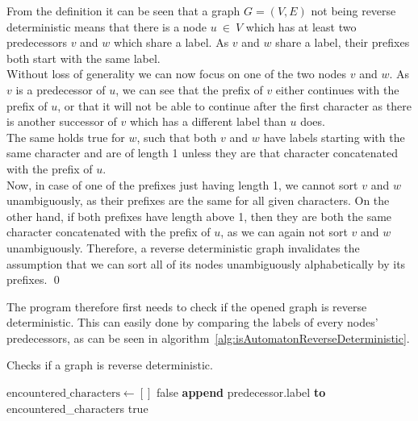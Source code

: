 \documentclass[a4paper,12pt,twoside,BCOR=10mm]{scrbook}
\begin{document}
From the definition it can be seen that a graph $ G = (V, E) $ not being reverse deterministic means that there 
is a node $ u {\: \in \:} V $ which has at least two predecessors $ v $ and $ w $ which share a label. 
As $ v $ and $ w $ share a label, their prefixes both start with the same label. \\
Without loss of generality we can now focus on one of the two nodes $ v $ and $ w $. 
As $ v $ is a predecessor of $ u $, we can see that the 
prefix of $ v $ either continues with the prefix of $ u $, 
or that it will not be able to continue after the first character 
as there is another successor of $ v $ which has a different label than $ u $ does. \\
The same holds true for $ w $, such that both $ v $ and $ w $ have labels starting 
with the same character and are of length 1 unless they are that character concatenated 
with the prefix of $ u $. \\
Now, in case of one of the prefixes just having length 1, we cannot sort $ v $ and $ w $ 
unambiguously, as their prefixes are the same for all given characters. 
On the other hand, if both prefixes have length above 1, then they are both 
the same character concatenated with the prefix of $ u $, as we can again not sort $ v $ and $ w $ 
unambiguously. 
Therefore, a reverse deterministic graph invalidates the assumption that we can sort 
all of its nodes unambiguously alphabetically by its prefixes. \qed

The program therefore first needs to check if the opened graph is reverse deterministic. 
This can easily done by comparing the labels of every nodes' predecessors, as can be seen 
in algorithm~\ref{alg:isAutomatonReverseDeterministic}.

\begin{algorithm}
\caption[Check if a graph is reverse deterministic]{Checks if a graph is reverse deterministic.}
\label{alg:isAutomatonReverseDeterministic}
\begin{algorithmic}[1]
	\State $ \textrm{encountered\_characters} \gets [ ] $
			\State \Return false
		\Else
			\State \textbf{append} predecessor.label \textbf{to} encountered\_characters
		\EndIf
	\EndFor
\EndFor
\State \Return true
\end{algorithmic}
\end{algorithm}
\end{document}
